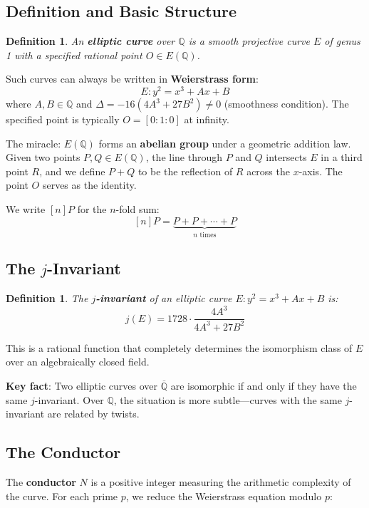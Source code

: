 \documentclass[11pt]{article}
\newtheorem{definition}[theorem]{Definition}
\begin{document}
\subsection{Definition and Basic Structure}

\begin{definition}
An \textbf{elliptic curve} over $\mathbb{Q}$ is a smooth projective curve $E$ of genus 1 with a specified rational point $O \in E(\mathbb{Q})$.
\end{definition}

Such curves can always be written in \textbf{Weierstrass form}:
$$E: y^2 = x^3 + Ax + B$$
where $A, B \in \mathbb{Q}$ and $\Delta = -16(4A^3 + 27B^2) \neq 0$ (smoothness condition). The specified point is typically $O = [0:1:0]$ at infinity.

The miracle: $E(\mathbb{Q})$ forms an \textbf{abelian group} under a geometric addition law. Given two points $P, Q \in E(\mathbb{Q})$, the line through $P$ and $Q$ intersects $E$ in a third point $R$, and we define $P + Q$ to be the reflection of $R$ across the $x$-axis. The point $O$ serves as the identity.

We write $[n]P$ for the $n$-fold sum:
$$[n]P = \underbrace{P + P + \cdots + P}_{n \text{ times}}$$

\subsection{The $j$-Invariant}

\begin{definition}
The \textbf{$j$-invariant} of an elliptic curve $E: y^2 = x^3 + Ax + B$ is:
$$j(E) = 1728 \cdot \frac{4A^3}{4A^3 + 27B^2}$$
\end{definition}

This is a rational function that completely determines the isomorphism class of $E$ over an algebraically closed field.

\textbf{Key fact}: Two elliptic curves over $\overline{\mathbb{Q}}$ are isomorphic if and only if they have the same $j$-invariant. Over $\mathbb{Q}$, the situation is more subtle---curves with the same $j$-invariant are related by twists.

\subsection{The Conductor}

The \textbf{conductor} $N$ is a positive integer measuring the arithmetic complexity of the curve. For each prime $p$, we reduce the Weierstrass equation modulo $p$:
\end{document}

